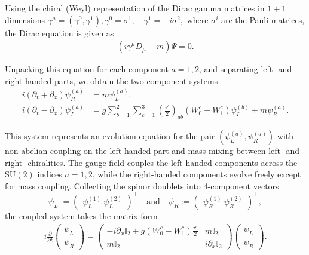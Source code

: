 \documentclass[reqno,12pt,letterpaper]{amsart}
\numberwithin{equation}{section}
\newcommand{\1}{\mathds{1}}
\theoremstyle{definition}
\begin{document}
Using the chiral (Weyl) representation of the Dirac gamma matrices in \(1+1\) dimensions $
\gamma^\mu = (\gamma^0, \gamma^1), 
\gamma^0 = \sigma^1, \quad
\gamma^1 = -i \sigma^2,
$
where \(\sigma^i\) are the Pauli matrices,
the Dirac equation is given as
\begin{align}
	(i \gamma^\mu D_\mu - m) \Psi = 0.
\end{align}

Unpacking this equation for each component \(a = 1,2\), and separating left- and right-handed parts, we obtain the two-component systems
\begin{align}
	i (\partial_t + \partial_x) \psi_R^{(a)} &= m \psi_L^{(a)}, \\
	i (\partial_t - \partial_x) \psi_L^{(a)} &= g \sum_{b=1}^2 \sum_{c=1}^3 \left( \frac{\tau^c}{2} \right)_{ab} (W_0^c - W_1^c) \psi_L^{(b)} + m \psi_R^{(a)}.
\end{align}


This system represents an evolution equation for the pair \((\psi_L^{(a)}, \psi_R^{(a)})\) with non-abelian coupling on the left-handed part and mass mixing between left- and right- chiralities. The gauge field couples the left-handed components across the \(\mathrm{SU}(2)\) indices \(a=1,2\), while the right-handed components evolve freely except for mass coupling.
Collecting the spinor doublets into 4-component vectors
\[
\psi_L := \begin{pmatrix} \psi_L^{(1)} \ \psi_L^{(2)} \end{pmatrix}^\top \quad \text{and} \quad
\psi_R := \begin{pmatrix} \psi_R^{(1)} \ \psi_R^{(2)} \end{pmatrix}^\top,
\]	
the coupled system takes the matrix form
\begin{align}
	i \frac{\partial}{\partial t} 
	\begin{pmatrix}
		\psi_L \\
		\psi_R
	\end{pmatrix}
	=
	\begin{pmatrix}
		- i \partial_x  \mathbb{I}_2 + g (W_0^c - W_1^c)  \frac{\tau^c}{2}
		& m \mathbb{I}_2 \\
		m \mathbb{I}_2 & i \partial_x  \mathbb{I}_2
	\end{pmatrix}
	\begin{pmatrix}
		\psi_L \\
		\psi_R
	\end{pmatrix}.
\end{align}
\end{document}
